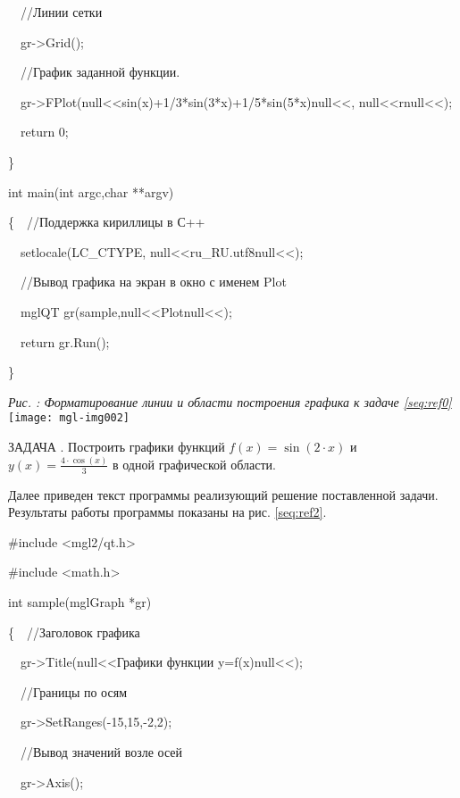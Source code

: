 {\upshape
\ \ //Линии сетки}

{\upshape
\ \ gr-{\textgreater}Grid();}

\ \ //График заданной функции.

{\upshape
\ \ gr-{\textgreater}FPlot(null{<<}sin(x)+1/3*sin(3*x)+1/5*sin(5*x)null{<<}, null{<<}rnull{<<});}

{\upshape
\ \ return 0;}

{\upshape
\}}

{\upshape
int main(int argc,char **argv)}

{\upshape
\{\ \ //Поддержка кириллицы в С++}

{\upshape
\ \ setlocale(LC\_CTYPE, null{<<}ru\_RU.utf8null{<<});}

{\upshape
\ \ //Вывод графика на экран в окно с именем Plot}

{\upshape
\ \ mglQT gr(sample,null{<<}Plotnull{<<});}

{\upshape
\ \ return gr.Run();}

{\upshape
\}}

{\centering \begin{minipage}{14.081cm}
{\itshape
Рис. {\theqwertya\label{seq:ref1}}: Форматирование линии и области построения графика к задаче
\ref{seq:ref0}}
\texttt{[image: mgl-img002]}\end{minipage}\par}

ЗАДАЧА {\theqwerty\label{seq:ref1a}}. Построить графики функций  $f(x)=\sin (2\cdot x)$ и 
$y(x)=\frac{4\cdot \cos (x)}{3}$  в одной графической области.

Далее приведен текст программы реализующий решение поставленной задачи. Результаты работы программы показаны на рис.
\ref{seq:ref2}.

\#include {\textless}mgl2/qt.h{\textgreater}

\#include {\textless}math.h{\textgreater}

int sample(mglGraph *gr)

{\upshape
\{\ \ //Заголовок графика}

\ \ gr-{\textgreater}Title(null{<<}Графики функции y=f(x)null{<<});

{\upshape
\ \ //Границы по осям}

\ \ gr-{\textgreater}SetRanges(-15,15,-2,2);

{\upshape
\ \ //Вывод значений возле осей}

\ \ gr-{\textgreater}Axis();

